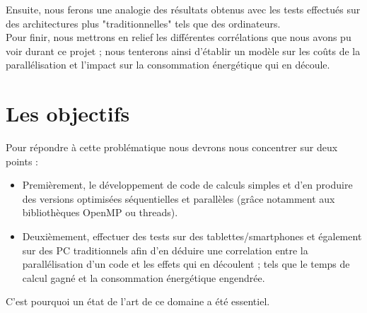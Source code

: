 		Ensuite, nous ferons une analogie des résultats obtenus avec les tests effectués sur des architectures plus "traditionnelles" tels que des ordinateurs.\\

		Pour finir, nous mettrons en relief les différentes corrélations que nous avons pu voir durant ce projet ; nous tenterons ainsi d'établir un modèle sur les coûts de la parallélisation et l'impact sur la consommation énergétique qui en découle.
\newpage
	\section{Les objectifs}
	Pour répondre à cette problématique  nous devrons nous concentrer sur deux points : \\
	\begin{itemize}
	\item{ Premièrement, le développement de code de calculs simples et d'en produire des versions optimisées séquentielles et parallèles (grâce notamment aux bibliothèques OpenMP ou threads).\\}
	\item{ Deuxièmement, effectuer des tests sur des tablettes/smartphones et également sur des PC traditionnels afin d'en déduire une correlation entre la parallélisation d'un code et les effets qui en découlent ; tels que le temps de calcul gagné et la consommation énergétique engendrée.\\}
	\end{itemize}

	C'est pourquoi un état de l'art de ce domaine a été essentiel.

